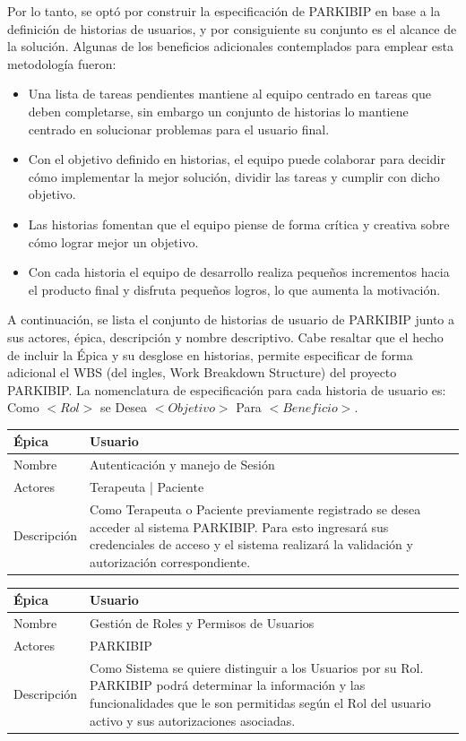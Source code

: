 Por lo tanto, se optó por construir la especificación de PARKIBIP en base a la definición de historias de usuarios, y por consiguiente su conjunto es el alcance de la solución. Algunas de los beneficios adicionales contemplados para emplear esta metodología fueron:

\begin{itemize}
    \item Una lista de tareas pendientes mantiene al equipo centrado en tareas que deben completarse, sin embargo un conjunto de historias lo mantiene centrado en solucionar problemas para el usuario final.
    \item Con el objetivo definido en historias, el equipo puede colaborar para decidir cómo implementar la mejor solución, dividir las tareas y cumplir con dicho objetivo.
    \item Las historias fomentan que el equipo piense de forma crítica y creativa sobre cómo lograr mejor un objetivo.
    \item Con cada historia el equipo de desarrollo realiza pequeños incrementos hacia el producto final y disfruta pequeños logros, lo que aumenta la motivación.
\end{itemize}

A continuación, se lista el conjunto de historias de usuario de PARKIBIP junto a sus actores, épica, descripción y nombre descriptivo. Cabe resaltar que el hecho de incluir la Épica y su desglose en historias, permite especificar de forma adicional el WBS  (del ingles, Work Breakdown Structure) del proyecto PARKIBIP. La nomenclatura de especificación para cada historia de usuario es: Como $<Rol>$ se Desea $<Objetivo>$ Para $<Beneficio>$.

\begin{table}[H] 
\centering
\begin{tabular}{| p{2cm} | p{10cm} |}
\hline
Épica & Usuario\\ \hline
Nombre & Autenticación y manejo de Sesión\\ \hline
Actores & Terapeuta | Paciente\\ \hline
Descripción &  Como Terapeuta o Paciente previamente registrado se desea acceder al sistema PARKIBIP. Para esto ingresará sus credenciales de acceso y el sistema realizará la validación y autorización correspondiente.\\ \hline
\end{tabular}
\end{table}

\begin{table}[H] 
\centering
\begin{tabular}{|p{2cm} | p{10cm} |}
\hline
Épica & Usuario\\ \hline
Nombre & Gestión de Roles y Permisos de Usuarios\\ \hline
Actores & PARKIBIP\\ \hline
Descripción &  Como Sistema se quiere distinguir a los Usuarios por su Rol. PARKIBIP podrá determinar la información y las funcionalidades que le son permitidas según el Rol del usuario activo y sus autorizaciones asociadas.\\ \hline
\end{tabular}
\end{table}

